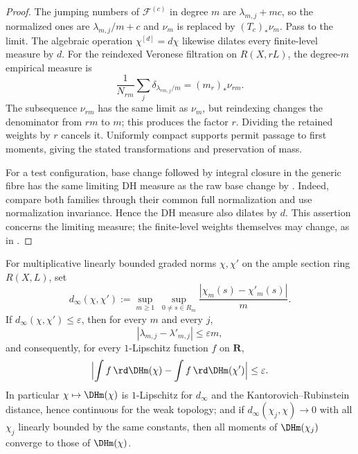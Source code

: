 \begin{proof}
The jumping numbers of $\mathcal F^{(c)}$ in degree $m$ are $\lambda_{m,j}+mc$, so the normalized ones are $\lambda_{m,j}/m+c$ and $\nu_m$ is replaced by $(T_c)_*\nu_m$. Pass to the limit. The algebraic operation $\chi^{[d]}=d\chi$ likewise dilates every finite-level measure by $d$.  For the reindexed Veronese filtration on $R(X,rL)$, the degree-$m$ empirical measure is
\[
 \frac1{N_{rm}}\sum_j\delta_{\lambda_{rm,j}/m}
 =(m_r)_*\nu_{rm}.
\]
The subsequence $\nu_{rm}$ has the same limit as $\nu_m$, but reindexing
changes the denominator from $rm$ to $m$; this produces the factor $r$.
Dividing the retained weights by $r$ cancels it.  Uniformly compact
supports permit passage to first moments, giving the stated transformations
and preservation of mass.

For a test configuration, base change followed by integral closure in the
generic fibre has the same limiting DH measure as the raw base change by
\cite[Corollary~5.8 and Proposition~5.9]{BHJ17}.  Indeed, compare both
families through their common full normalization and use normalization
invariance.  Hence the DH measure also dilates by $d$.  This assertion
concerns the limiting measure; the finite-level weights themselves may
change, as in .
\end{proof}

\begin{proposition}
\label{prop:ch33-dh-continuity}
For multiplicative linearly bounded graded norms $\chi,\chi'$ on the
ample section ring $R(X,L)$, set
\begin{equation}
\label{eq:ch33-dinfty}
 d_\infty(\chi,\chi')
 :=\sup_{m\geq1}\ \sup_{0\ne s\in R_m}
        \frac{|\chi_m(s)-\chi'_m(s)|}{m}.
\end{equation}
If $d_\infty(\chi,\chi')\leq\varepsilon$, then for every $m$ and every
$j$,
\begin{equation}
\label{eq:ch33-jumping-comparison}
 |\lambda_{m,j}-\lambda'_{m,j}|\leq\varepsilon m ,
\end{equation}
and consequently, for every $1$-Lipschitz function $f$ on
$\mathbf R$,
\begin{equation}
\label{eq:ch33-dh-lipschitz}
 \Bigl|\int f\,\rd\DHm(\chi)-\int f\,\rd\DHm(\chi')\Bigr|
 \leq\varepsilon .
\end{equation}
In particular $\chi\mapsto\DHm(\chi)$ is $1$-Lipschitz for
$d_\infty$ and the Kantorovich--Rubinstein distance, hence continuous for
the weak topology; and if $d_\infty(\chi_j,\chi)\to0$ with all
$\chi_j$ linearly bounded by the same constants, then all moments of
$\DHm(\chi_j)$ converge to those of $\DHm(\chi)$.
\end{proposition}

